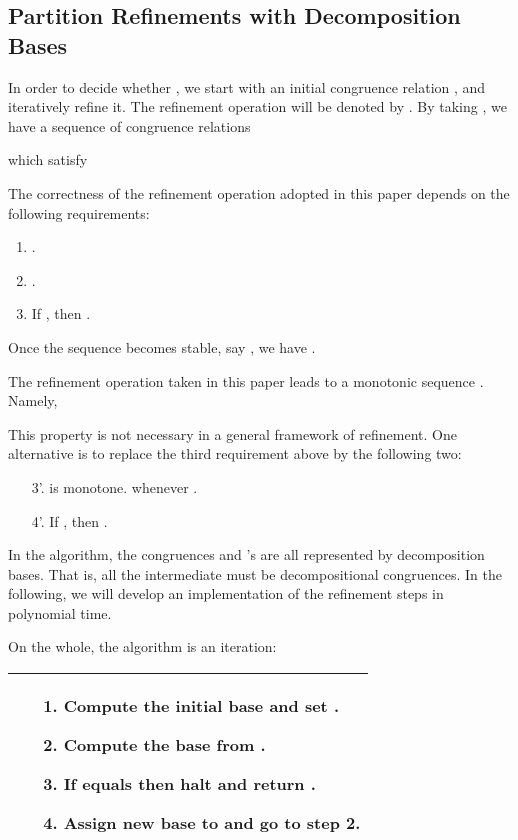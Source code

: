 \documentclass{llncs}
\begin{document}
\subsection{Partition Refinements with Decomposition Bases}
In order to decide whether , we start with
an initial congruence relation ,
and iteratively refine it. The refinement operation will be denoted by . By taking , we have a sequence of congruence relations

which satisfy

The correctness of the refinement operation adopted in this paper depends on the following requirements:
\begin{enumerate}
\item
.

\item
.

\item
If , then .
\end{enumerate}
Once the sequence becomes stable, say , we have .

\begin{remark}
The refinement operation taken in this paper leads to a monotonic sequence .  Namely,

This property is not necessary in a general framework of refinement. One alternative is to replace the third requirement above by the following two:
\begin{enumerate}
\item[3'.]
 is monotone.  whenever .


\item[4'.]
If , then .
\end{enumerate}
\end{remark}

In the algorithm,  the congruences  and 's are all represented by decomposition bases. That is, all the intermediate  must be decompositional congruences. In the following, we will develop an implementation of the refinement steps in polynomial time.




On the whole, the algorithm is an iteration:
\begin{center}
\small
 \begin{tabular}{|p{12cm}|}\hline\vspace{-2ex}
\begin{itemize}
\item[1.]
Compute the initial base  and set .

\item[2.]
Compute the base  from .

\item[3.]
If   equals  then halt and return .

\item[4.]
Assign new base  to  and go to step 2. \vspace{-1ex}
\end{itemize} \\
        \hline
\end{tabular}
\end{center}
\end{document}
